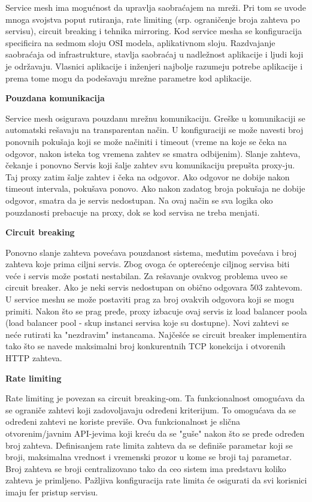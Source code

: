\documentclass[a4paper,12pt]{report}
\begin{document}
Service mesh ima mogućnost da upravlja saobraćajem na mreži. Pri tom se uvode mnoga svojstva poput rutiranja, rate limiting (srp. ograničenje broja zahteva po servisu),  circuit breaking i tehnika mirroring. Kod service mesha se konfiguracija specificira na sedmom sloju OSI modela, aplikativnom sloju. Razdvajanje saobraćaja od infrastrukture, stavlja saobraćaj u nadležnost aplikacije i ljudi koji je održavaju. Vlasnici aplikacije i inženjeri najbolje razumeju potrebe aplikacije i prema tome mogu da podešavaju mrežne parametre kod aplikacije. \newline

\textbf{Pouzdana komunikacija}\newline

Service mesh osigurava pouzdanu mrežnu komunikaciju. Greške u komunikaciji se automatski rešavaju na transparentan način. U konfiguraciji se može navesti broj ponovnih pokušaja koji se može načiniti i timeout (vreme na koje se čeka na odgovor, nakon isteka tog vremena zahtev se smatra odbijenim). Slanje zahteva, čekanje i ponovno  Servis koji šalje zahtev svu komunikaciju prepušta proxy-ju. Taj proxy zatim šalje zahtev i čeka na odgovor. Ako odgovor ne dobije nakon timeout intervala, pokušava ponovo. Ako nakon zadatog broja pokušaja ne dobije odgovor, smatra da je servis nedostupan.  Na ovaj način se sva logika oko pouzdanosti prebacuje na proxy, dok se kod servisa ne treba menjati. \newline

\textbf{Circuit breaking}\newline

Ponovno slanje zahteva povećava pouzdanost sistema, međutim povećava i broj zahteva koje prima ciljni servis. Zbog ovoga će opterećenje ciljnog servisa biti veće i servis može postati nestabilan. Za rešavanje ovakvog problema uveo se circuit breaker. Ako je neki servis nedostupan on obično odgovara 503 zahtevom. U service meshu se može postaviti prag za broj ovakvih odgovora koji se mogu primiti. Nakon što se prag pređe, proxy izbacuje ovaj servis iz load balancer poola (load balancer pool - skup instanci servisa koje su dostupne). Novi zahtevi se neće rutirati ka "nezdravim" instancama. Najčešće se circuit breaker implementira tako što se navede maksimalni broj konkurentnih TCP konekcija i otvorenih HTTP zahteva. \newline

\textbf{Rate limiting}\newline

Rate limiting je povezan sa circuit breaking-om. Ta funkcionalnost omogućava da se ograniče zahtevi koji zadovoljavaju određeni kriterijum. To omogućava da se određeni zahtevi ne koriste previše. Ova funkcionalnost je slična otvorenim/javnim API-jevima koji kreću da se "guše" nakon što se pređe određen broj zahteva. Definisanjem rate limita zahteva da se definiše parametar koji se broji, maksimalna vrednost i vremenski prozor u kome se broji taj parametar. Broj zahteva se broji centralizovano tako da ceo sistem ima predstavu koliko zahteva je primljeno. Pažljiva konfiguracija rate limita će osigurati da svi korisnici imaju fer pristup servisu. \newline
\end{document}

